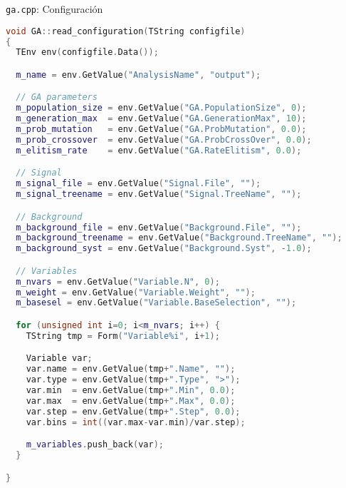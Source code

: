 \documentclass[center,10pt,cm]{beamer}
\begin{document}
\begin{frame}[fragile]{\texttt{ga.cpp}: Configuraci\'on}

  \begin{lstlisting}[language=c++]
    void GA::read_configuration(TString configfile)
{
  TEnv env(configfile.Data());

  m_name = env.GetValue("AnalysisName", "output");

  // GA parameters
  m_population_size = env.GetValue("GA.PopulationSize", 0);
  m_generation_max  = env.GetValue("GA.GenerationMax", 10);
  m_prob_mutation   = env.GetValue("GA.ProbMutation", 0.0);
  m_prob_crossover  = env.GetValue("GA.ProbCrossOver", 0.0);
  m_elitism_rate    = env.GetValue("GA.RateElitism", 0.0);

  // Signal
  m_signal_file = env.GetValue("Signal.File", "");
  m_signal_treename = env.GetValue("Signal.TreeName", "");

  // Background
  m_background_file = env.GetValue("Background.File", "");
  m_background_treename = env.GetValue("Background.TreeName", "");
  m_background_syst = env.GetValue("Background.Syst", -1.0);

  // Variables
  m_nvars = env.GetValue("Variable.N", 0);
  m_weight = env.GetValue("Variable.Weight", "");
  m_basesel = env.GetValue("Variable.BaseSelection", "");

  for (unsigned int i=0; i<m_nvars; i++) {
    TString tmp = Form("Variable%i", i+1);

    Variable var;
    var.name = env.GetValue(tmp+".Name", "");
    var.type = env.GetValue(tmp+".Type", ">");
    var.min  = env.GetValue(tmp+".Min", 0.0);
    var.max  = env.GetValue(tmp+".Max", 0.0);
    var.step = env.GetValue(tmp+".Step", 0.0);
    var.bins = int((var.max-var.min)/var.step);

    m_variables.push_back(var);
  }

}
\end{lstlisting}

\end{frame}
\end{document}
